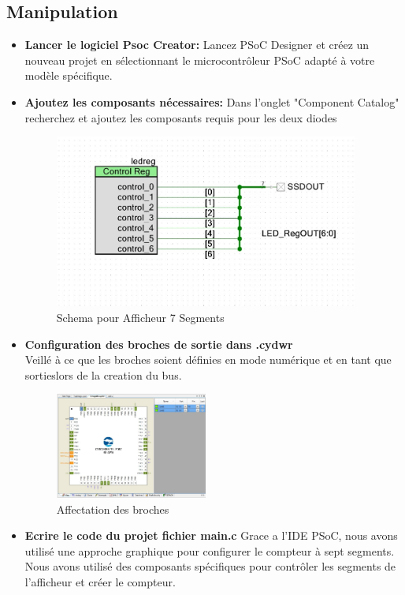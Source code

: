  \subsection{Manipulation}
 \label{sec:Manipulation}
 \begin{itemize}
     \item \textbf{Lancer le logiciel Psoc Creator:}
     Lancez PSoC Designer et créez un nouveau projet en sélectionnant 
     le microcontrôleur PSoC adapté à votre modèle spécifique.
     \item \textbf{Ajoutez les composants nécessaires: } 
     Dans l'onglet "Component Catalog"
     recherchez et ajoutez les composants requis pour les deux diodes
     \begin{figure}[htp]
         \centering
         \includegraphics[width=10cm]{images/schema3.jpg }
         \caption{Schema pour Afficheur 7 Segments }
         \label{fig:example10}
       \end{figure}
\newpage
     \item \textbf{Configuration des broches de sortie dans .cydwr}\\
     Veillé à ce que les broches soient définies en mode numérique et en tant que sortieslors de la creation du bus.
     \begin{figure}[htp]
         \centering
         \includegraphics[width=5cm]{images/broche2.jpg }
         \caption{Affectation des broches }
         \label{fig:example7}
       \end{figure}
     \item \textbf{Ecrire le code du projet fichier main.c}
     Grace a l'IDE PSoC, nous avons utilisé une approche graphique pour configurer le compteur à sept segments.
  Nous avons utilisé des composants spécifiques pour contrôler les segments de l'afficheur et créer le compteur.


\end{itemize}
